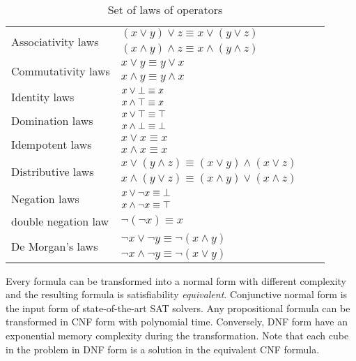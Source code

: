 \begin{table}[!htbp]
 \centering
 \begin{tabular}{lllc}
  \multirow{2}{*}{Associativity laws} & $(x \lor y) \lor z \equiv x \lor (y \lor z)$\\
          & $(x \land y) \land z \equiv x \land (y \land z)$\\
  \hline              
  \multirow{2}{*}{Commutativity laws} & $x \lor y \equiv y \lor x$\\
          & $x \land y \equiv y \land x$\\
  \hline      
  \multirow{2}{*}{Identity laws} & $x \lor \bot \equiv x$\\
           & $x \land \top \equiv x$\\
  \hline        
  \multirow{2}{*}{Domination laws} & $x \lor \top \equiv \top$\\
           &  $x \land \bot \equiv \bot$\\
  \hline        
  \multirow{2}{*}{Idempotent laws} & $x \lor x \equiv x$\\
               & $x \land x \equiv x$\\     
  \hline        
  \multirow{2}{*}{Distributive laws} & $x \lor (y \land z) \equiv (x \lor y) \land (x \lor z)$\\
           & $x \land (y \lor z) \equiv (x \land y) \lor (x \land z)$\\
 \hline        
 \multirow{2}{*}{Negation laws}  & $x \lor \neg x \equiv \bot$\\
        & $x \land \neg x \equiv \top$\\
  \hline
   double negation law & $\neg (\neg x) \equiv x$ \\
  \hline
  \multirow{2}{*}{De Morgan's laws} & $\neg x \lor \neg y \equiv \neg (x \land y)$\\
            &  $\neg x \land \neg y \equiv \neg (x \lor y)$\\
 \end{tabular}
 \caption{Set of laws of operators}
 \label{tab:laws}
\end{table}

Every formula can be transformed into a normal form with different complexity and the resulting formula is 
satisfiability \emph{equivalent}.
Conjunctive normal form is the input form of state-of-the-art SAT solvers. Any propositional
formula can be transformed in CNF form with polynomial time\cite{Russell1994ArtiCI}. Conversely, DNF form have
an exponential memory complexity during the transformation\cite{darwiche2002knowledge}.
Note that each cube in the problem in DNF form is a solution in the equivalent CNF formula.

